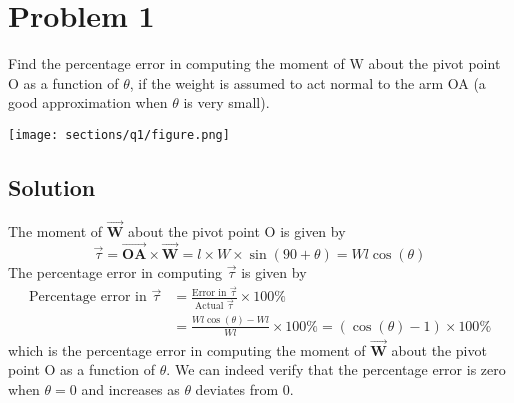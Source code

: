 \section*{Problem 1}

Find the percentage error in computing the moment of W about the pivot point O as a function of \( \theta \), if the weight is assumed to act normal to the arm OA (a good approximation when \( \theta \) is very small).

\begin{figure*}[h]
    \centering
    \texttt{[image: sections/q1/figure.png]}
\end{figure*}

\subsection*{Solution}

The moment of \( \vec{\mathbf{W}} \) about the pivot point O is given by
\[
    \vec{\tau} = \vec{\mathbf{OA}} \times \vec{\mathbf{W}}
    = l \times W \times \sin(90 + \theta)
    = W l \cos(\theta)
\]
The percentage error in computing \( \vec{\tau} \) is given by
\begin{align*}
    \text{Percentage error in } \vec{\tau}
     & =
    \frac{\text{Error in }\vec{\tau}}{\text{Actual }\vec{\tau}} \times 100\% \\
     & = \frac{W l \cos(\theta) - W l}{W l} \times 100\%
    = (\cos(\theta) - 1) \times 100\%
\end{align*}
which is the percentage error in computing the moment of \( \vec{\mathbf{W}} \) about the pivot point O as a function of \( \theta \).
We can indeed verify that the percentage error is zero when \( \theta = 0 \) and increases as \( \theta \) deviates from 0.
